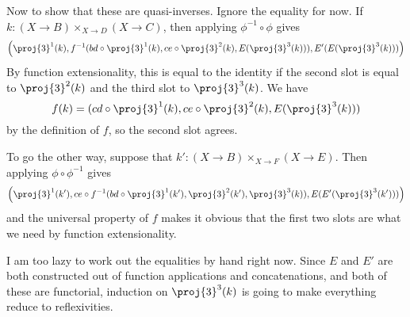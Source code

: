 Now to show that these are quasi-inverses.  Ignore the equality for now.
If $k : (X \to B) \times_{X\to D} (X \to C)$, then applying $\phi^{-1} \circ
\phi$ gives
\[
  \left(
    \proj{3}^{1}(k),
    f^{-1}(bd \circ \proj{3}^{1}(k),
           ce \circ \proj{3}^{2}(k),
           E(\proj{3}^{3}(k))),
    E'(E(\proj{3}^{3}(k)))
  \right)
\]
By function extensionality, this is equal to the identity if the second slot is
equal to $\proj{3}^{2}(k)$ and the third slot to $\proj{3}^{3}(k)$.  We have
\[
  f(k) = (cd \circ \proj{3}^{1}(k), ce \circ \proj{3}^{2}(k), E(\proj{3}^{3}(k)))
\]
by the definition of $f$, so the second slot agrees.


To go the other way, suppose that $k' : (X \to B) \times_{X\to F} (X \to E)$.
Then applying $\phi \circ \phi^{-1}$ gives
\[
  \left(
    \proj{3}^{1}(k'),
    ce \circ f^{-1}(bd \circ \proj{3}^{1}(k'), \proj{3}^{2}(k'), \proj{3}^{3}(k)),
    E(E'(\proj{3}^{3}(k')))
  \right)
\]
and the universal property of $f$ makes it obvious that the first two slots are
what we need by function extensionality.


I am too lazy to work out the equalities by hand right now.  Since $E$ and $E'$
are both constructed out of function applications and concatenations, and both
of these are functorial, induction on $\proj{3}^{3}(k)$ is going to make
everything reduce to reflexivities.


